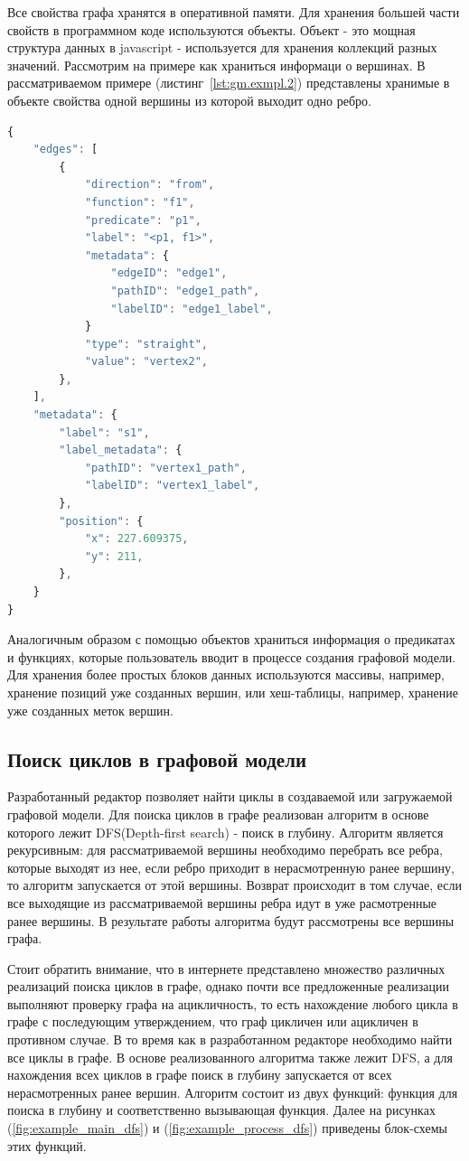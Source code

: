 Все свойства графа хранятся в оперативной памяти. Для хранения большей части свойств в программном коде используются объекты. Объект - это мощная структура данных в javascript - используется для хранения коллекций разных значений. Рассмотрим на примере как храниться информаци о вершинах. В рассматриваемом примере (листинг~\ref{lst:gm.exmpl.2}) представлены хранимые в объекте свойства одной вершины из которой выходит одно ребро.

\begin{lstlisting}[label={lst:gm.exmpl.2}, caption={Пример хранение вершины в оперативной памяти}, language=JavaScript]
{
    "edges": [
        {
            "direction": "from",
            "function": "f1",
            "predicate": "p1",
            "label": "<p1, f1>",
            "metadata": {
                "edgeID": "edge1",
                "pathID": "edge1_path",
                "labelID": "edge1_label",
            }
            "type": "straight",
            "value": "vertex2",
        },
    ],
    "metadata": {
        "label": "s1",
        "label_metadata": {
            "pathID": "vertex1_path",
            "labelID": "vertex1_label",
        },
        "position": {
            "x": 227.609375,
            "y": 211,
        },
    }
}
\end{lstlisting}

Аналогичным образом с помощью объектов храниться информация о предикатах и функциях, которые пользователь вводит в процессе создания графовой модели. Для хранения более простых блоков данных используются массивы, например, хранение позиций уже созданных вершин, или хеш-таблицы, например, хранение уже созданных меток вершин.

\subsection{Поиск циклов в графовой модели}
Разработанный редактор позволяет найти циклы в создаваемой или загружаемой графовой модели. Для поиска циклов в графе реализован алгоритм в основе которого лежит DFS(Depth-first search) - поиск в глубину. Алгоритм является рекурсивным: для рассматриваемой вершины необходимо перебрать все ребра, которые выходят из нее, если ребро приходит в нерасмотренную ранее вершину, то алгоритм запускается от этой вершины. Возврат происходит в том случае, если все выходящие из рассматриваемой вершины ребра идут в уже расмотренные ранее вершины. В результате работы алгоритма будут рассмотрены все вершины графа. 

Стоит обратить внимание, что в интернете представлено множество различных реализаций поиска циклов в графе, однако почти все предложенные реализации выполняют проверку графа на ацикличность, то есть нахождение любого цикла в графе с последующим утверждением, что граф цикличен или ацикличен в противном случае. В то время как в разработанном редакторе необходимо найти все циклы в графе. В основе реализованного алгоритма также лежит DFS, а для нахождения всех циклов в графе поиск в глубину запускается от всех нерасмотренных ранее вершин. Алгоритм состоит из двух функций: функция для поиска в глубину и соответственно вызывающая функция. 
Далее на рисунках (\ref{fig:example_main_dfs}) и (\ref{fig:example_process_dfs}) приведены блок-схемы этих функций.


